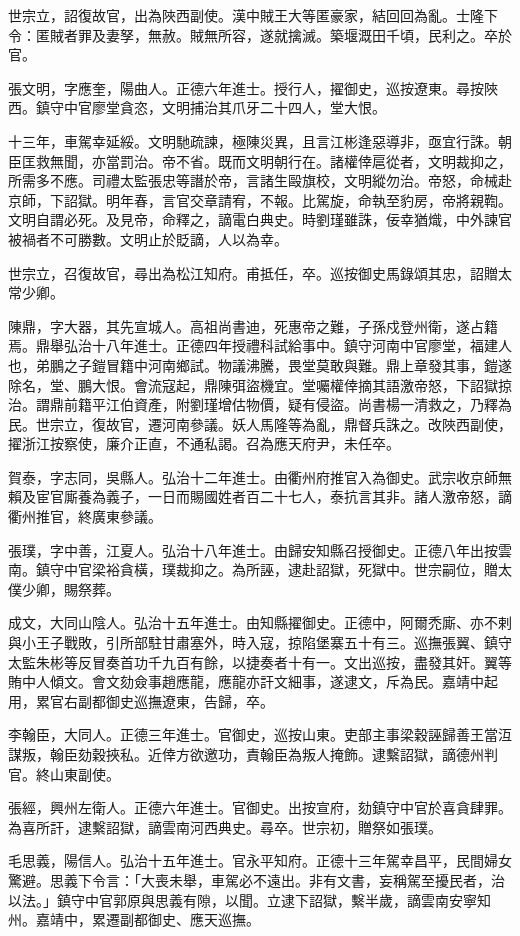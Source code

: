 \begin{pinyinscope}
世宗立，詔復故官，出為陜西副使。漢中賊王大等匿豪家，結回回為亂。士隆下令：匿賊者罪及妻孥，無赦。賊無所容，遂就擒滅。築堰溉田千頃，民利之。卒於官。

張文明，字應奎，陽曲人。正德六年進士。授行人，擢御史，巡按遼東。尋按陜西。鎮守中官廖堂貪恣，文明捕治其爪牙二十四人，堂大恨。

十三年，車駕幸延綏。文明馳疏諫，極陳災異，且言江彬逢惡導非，亟宜行誅。朝臣匡救無聞，亦當罰治。帝不省。既而文明朝行在。諸權倖扈從者，文明裁抑之，所需多不應。司禮太監張忠等譖於帝，言諸生毆旗校，文明縱勿治。帝怒，命械赴京師，下詔獄。明年春，言官交章請宥，不報。比駕旋，命執至豹房，帝將親鞫。文明自謂必死。及見帝，命釋之，謫電白典史。時劉瑾雖誅，佞幸猶熾，中外諫官被禍者不可勝數。文明止於貶謫，人以為幸。

世宗立，召復故官，尋出為松江知府。甫抵任，卒。巡按御史馬錄頌其忠，詔贈太常少卿。

陳鼎，字大器，其先宣城人。高祖尚書迪，死惠帝之難，子孫戍登州衛，遂占籍焉。鼎舉弘治十八年進士。正德四年授禮科試給事中。鎮守河南中官廖堂，福建人也，弟鵬之子鎧冒籍中河南鄉試。物議沸騰，畏堂莫敢與難。鼎上章發其事，鎧遂除名，堂、鵬大恨。會流寇起，鼎陳弭盜機宜。堂囑權倖摘其語激帝怒，下詔獄掠治。謂鼎前籍平江伯資產，附劉瑾增估物價，疑有侵盜。尚書楊一清救之，乃釋為民。世宗立，復故官，遷河南參議。妖人馬隆等為亂，鼎督兵誅之。改陜西副使，擢浙江按察使，廉介正直，不通私謁。召為應天府尹，未任卒。

賀泰，字志同，吳縣人。弘治十二年進士。由衢州府推官入為御史。武宗收京師無賴及宦官廝養為義子，一日而賜國姓者百二十七人，泰抗言其非。諸人激帝怒，謫衢州推官，終廣東參議。

張璞，字中善，江夏人。弘治十八年進士。由歸安知縣召授御史。正德八年出按雲南。鎮守中官梁裕貪橫，璞裁抑之。為所誣，逮赴詔獄，死獄中。世宗嗣位，贈太僕少卿，賜祭葬。

成文，大同山陰人。弘治十五年進士。由知縣擢御史。正德中，阿爾禿廝、亦不剌與小王子戰敗，引所部駐甘肅塞外，時入寇，掠陷堡寨五十有三。巡撫張翼、鎮守太監朱彬等反冒奏首功千九百有餘，以捷奏者十有一。文出巡按，盡發其奸。翼等賄中人傾文。會文劾僉事趙應龍，應龍亦訐文細事，遂逮文，斥為民。嘉靖中起用，累官右副都御史巡撫遼東，告歸，卒。

李翰臣，大同人。正德三年進士。官御史，巡按山東。吏部主事梁穀誣歸善王當沍謀叛，翰臣劾穀挾私。近倖方欲邀功，責翰臣為叛人掩飾。逮繫詔獄，謫德州判官。終山東副使。

張經，興州左衛人。正德六年進士。官御史。出按宣府，劾鎮守中官於喜貪肆罪。為喜所訐，逮繫詔獄，謫雲南河西典史。尋卒。世宗初，贈祭如張璞。

毛思義，陽信人。弘治十五年進士。官永平知府。正德十三年駕幸昌平，民間婦女驚避。思義下令言：「大喪未舉，車駕必不遠出。非有文書，妄稱駕至擾民者，治以法。」鎮守中官郭原與思義有隙，以聞。立逮下詔獄，繫半歲，謫雲南安寧知州。嘉靖中，累遷副都御史、應天巡撫。


\end{pinyinscope}
